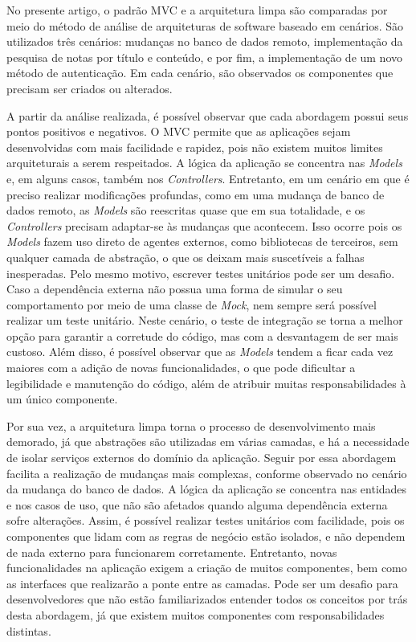 No presente artigo, o padrão MVC e a arquitetura limpa são comparadas por meio do método de análise de arquiteturas de software baseado em cenários.
São utilizados três cenários: mudanças no banco de dados remoto, implementação da pesquisa de notas por título e conteúdo, e por fim, a implementação de um novo método de autenticação.
Em cada cenário, são observados os componentes que precisam ser criados ou alterados.

A partir da análise realizada, é possível observar que cada abordagem possui seus pontos positivos e negativos.
O MVC permite que as aplicações sejam desenvolvidas com mais facilidade e rapidez, pois não existem muitos limites arquiteturais a serem respeitados.
A lógica da aplicação se concentra nas \emph{Models} e, em alguns casos, também nos \emph{Controllers}.
Entretanto, em um cenário em que é preciso realizar modificações profundas, como em uma mudança de banco de dados remoto, as \emph{Models} são reescritas quase que em sua totalidade, e os \emph{Controllers} precisam adaptar-se às mudanças que acontecem.
Isso ocorre pois os \emph{Models} fazem uso direto de agentes externos, como bibliotecas de terceiros, sem qualquer camada de abstração, o que os deixam mais suscetíveis a falhas inesperadas.
Pelo mesmo motivo, escrever testes unitários pode ser um desafio.
Caso a dependência externa não possua uma forma de simular o seu comportamento por meio de uma classe de \emph{Mock}, nem sempre será possível realizar um teste unitário.
Neste cenário, o teste de integração se torna a melhor opção para garantir a corretude do código, mas com a desvantagem de ser mais custoso.
Além disso, é possível observar que as \emph{Models} tendem a ficar cada vez maiores com a adição de novas funcionalidades, o que pode dificultar a legibilidade e manutenção do código, além de atribuir muitas responsabilidades à um único componente.

Por sua vez, a arquitetura limpa torna o processo de desenvolvimento mais demorado, já que abstrações são utilizadas em várias camadas, e há a necessidade de isolar serviços externos do domínio da aplicação.
Seguir por essa abordagem facilita a realização de mudanças mais complexas, conforme observado no cenário da mudança do banco de dados.
A lógica da aplicação se concentra nas entidades e nos casos de uso, que não são afetados quando alguma dependência externa sofre alterações.
Assim, é possível realizar testes unitários com facilidade, pois os componentes que lidam com as regras de negócio estão isolados, e não dependem de nada externo para funcionarem corretamente.
Entretanto, novas funcionalidades na aplicação exigem a criação de muitos componentes, bem como as interfaces que realizarão a ponte entre as camadas.
Pode ser um desafio para desenvolvedores que não estão familiarizados entender todos os conceitos por trás desta abordagem, já que existem muitos componentes com responsabilidades distintas.

